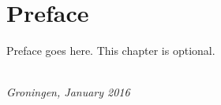 \chapter*{Preface}

Preface goes here. This chapter is optional.

\begin{flushright}
{\makeatletter\itshape
    \@firstname\ \@lastname \\
    Groningen, January 2016
\makeatother}
\end{flushright}

